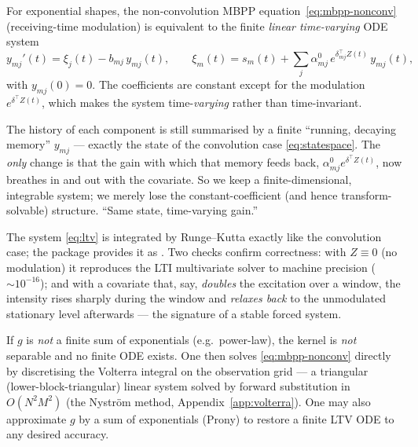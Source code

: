 \begin{theorem}\label{thm:ltv}
For exponential shapes, the non-convolution MBPP equation~\eqref{eq:mbpp-nonconv}
(receiving-time modulation) is equivalent to the finite \emph{linear time-varying}
ODE system
\begin{equation}
y_{mj}'(t)=\xi_j(t)-b_{mj}\,y_{mj}(t),
\qquad
\xi_m(t)=s_m(t)+\sum_{j} \alpha^0_{mj}\,e^{\delta_{mj}^\top Z(t)}\,y_{mj}(t),
\label{eq:ltv}
\end{equation}
with $y_{mj}(0)=0$. The coefficients are constant except for the modulation
$e^{\delta^\top Z(t)}$, which makes the system time-\emph{varying} rather than
time-invariant.
\end{theorem}

\begin{intuition}
The history of each component is still summarised by a finite ``running, decaying
memory'' $y_{mj}$ --- exactly the state of the convolution case
\eqref{eq:statespace}. The \emph{only} change is that the gain with which that
memory feeds back, $\alpha^0_{mj}e^{\delta^\top Z(t)}$, now breathes in and out with
the covariate. So we keep a finite-dimensional, integrable system; we merely lose
the constant-coefficient (and hence transform-solvable) structure. ``Same state,
time-varying gain.''
\end{intuition}

The system \eqref{eq:ltv} is integrated by Runge--Kutta exactly like the
convolution case; the package provides it as . Two checks
confirm correctness: with $Z\equiv 0$ (no modulation) it reproduces the LTI
multivariate solver to machine precision ($\sim10^{-16}$); and with a covariate
that, say, \emph{doubles} the excitation over a window, the intensity rises sharply
during the window and \emph{relaxes back} to the unmodulated stationary level
afterwards --- the signature of a stable forced system.

\begin{remark}
If $g$ is \emph{not} a finite sum of exponentials (e.g.\ power-law), the kernel is
\emph{not} separable and no finite ODE exists. One then solves
\eqref{eq:mbpp-nonconv} directly by discretising the Volterra integral on the
observation grid --- a triangular (lower-block-triangular) linear system solved by
forward substitution in $O(N^2 M^2)$ (the Nyström method,
Appendix~\ref{app:volterra}). One may also approximate $g$ by a sum of exponentials
(Prony) to restore a finite LTV ODE to any desired accuracy.
\end{remark}

